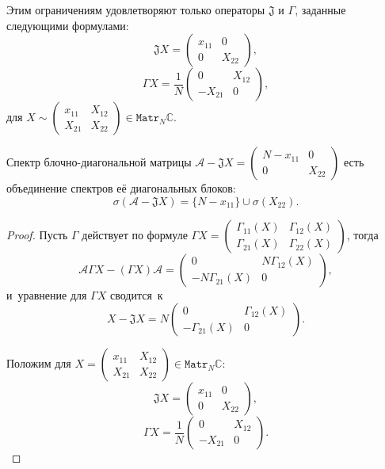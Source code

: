 \begin{lem}
    Этим ограничениям удовлетворяют только операторы \( \mathfrak{J} \) и \( \Gamma \),
    заданные следующими формулами:
    \[
        \mathfrak{J} X = \begin{pmatrix} x_{11} & 0 \\ 0 & X_{22} \end{pmatrix}, \]
    \[
        \Gamma X = \frac{1}{N} \begin{pmatrix} 0 & X_{12} \\ -X_{21} & 0 \end{pmatrix}, \]
        для \( X\sim \begin{pmatrix}x_{11} & X_{12} \\ X_{21} & X_{22}\end{pmatrix} \in \mathtt{Matr}_N\mathbb{C} \).

\end{lem}
\begin{crl}
    Спектр блочно-диагональной матрицы
    \( \mathcal{A} - \mathfrak{J}X = \begin{pmatrix} N - x_{11} & 0 \\ 0 & X_{22} \end{pmatrix} \)
    есть объединение спектров е\"е диагональных блоков:
    \[
        \sigma(\mathcal{A} - \mathfrak{J} X) = \{ N - x_{11} \} \cup \sigma(X_{22}). \]
\end{crl}
\begin{proof}
Пусть \( \Gamma \) действует по формуле
\( \Gamma X = \begin{pmatrix} \Gamma_{11}(X) & \Gamma_{12}(X) \\
                              \Gamma_{21}(X) & \Gamma_{22}(X)
                              \end{pmatrix} \), тогда
\[
    \mathcal{A} \Gamma X - (\Gamma X)\mathcal{A} = 
    \begin{pmatrix} 0 & N\Gamma_{12}(X) \\
        - N\Gamma_{21}(X) & 0
        \end{pmatrix}, \]
и~уравнение для \( \Gamma X \) сводится~к
\[
    X - \mathfrak{J} X =
    N \begin{pmatrix} 0 & \Gamma_{12}(X) \\
        - \Gamma_{21}(X) & 0
        \end{pmatrix}.
    \]

Положим для \( X =
    \begin{pmatrix}
    x_{11} & X_{12} \\
    X_{21} & X_{22}
    \end{pmatrix} \in \mathtt{Matr}_N\mathbb{C} \):
\[
    \mathfrak{J} X = \begin{pmatrix} x_{11} & 0 \\ 0 & X_{22} \end{pmatrix}, \]
\[
    \Gamma X = \frac{1}{N}\begin{pmatrix} 0 & X_{12} \\ -X_{21} & 0 \end{pmatrix}. \]
\end{proof}

